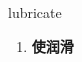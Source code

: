 
\begin{frame}
{\huge lubricate}
\begin{center}
\begin{enumerate}\Large
  \item \textbf{使润滑}
\end{enumerate}
\end{center}
\end{frame}
